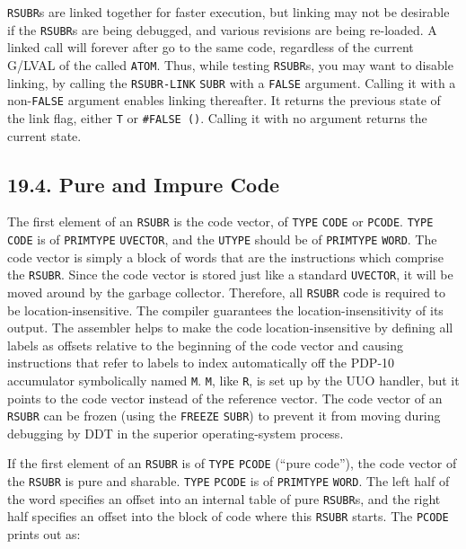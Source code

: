 \documentclass[a4paper,]{article}
\begin{document}
\texttt{RSUBR}s are linked together for faster execution, but linking may not be desirable if the \texttt{RSUBR}s are being
debugged, and various revisions are being re-loaded. A linked call will forever after go to the same code, regardless of
the current G/LVAL of the called \texttt{ATOM}. Thus, while testing \texttt{RSUBR}s, you may want to disable linking, by
calling the \texttt{RSUBR-LINK} \texttt{SUBR} with a \texttt{FALSE} argument. Calling it
with a non-\texttt{FALSE} argument enables linking thereafter. It returns the previous state of the link flag, either
\texttt{T} or \texttt{\#FALSE\ ()}. Calling it with no argument returns the current state.

\subsection{19.4. Pure and Impure Code}\label{pure-and-impure-code}

The first element of an \texttt{RSUBR} is the code vector, of \texttt{TYPE} \texttt{CODE}  or
\texttt{PCODE}. \texttt{TYPE} \texttt{CODE} is of \texttt{PRIMTYPE} \texttt{UVECTOR}, and the
\texttt{UTYPE} should be of \texttt{PRIMTYPE} \texttt{WORD}. The code vector is simply a block of words that are the
instructions which comprise the \texttt{RSUBR}. Since the code vector is stored just like a standard \texttt{UVECTOR}, it
will be moved around by the garbage collector. Therefore, all \texttt{RSUBR} code is required to be location-insensitive.
The compiler guarantees the location-insensitivity of its output. The assembler helps to make the code location-insensitive
by defining all labels as offsets relative to the beginning of the code vector and causing instructions that refer to
labels to index automatically off the PDP-10 accumulator symbolically named \texttt{M}. \texttt{M}, like \texttt{R}, is set
up by the UUO handler, but it points to the code vector instead of the reference vector. The code vector of an
\texttt{RSUBR} can be frozen (using the \texttt{FREEZE} \texttt{SUBR}) to prevent it from moving
during debugging by DDT in the superior operating-system process.

If the first element of an \texttt{RSUBR} is of \texttt{TYPE} \texttt{PCODE} (``pure code''), the code vector of the
\texttt{RSUBR} is pure and sharable. \texttt{TYPE} \texttt{PCODE} is of \texttt{PRIMTYPE} \texttt{WORD}. The left half of
the word specifies an offset into an internal table of pure \texttt{RSUBR}s, and the right half specifies an offset into
the block of code where this \texttt{RSUBR} starts. The \texttt{PCODE} prints out as:
\end{document}
